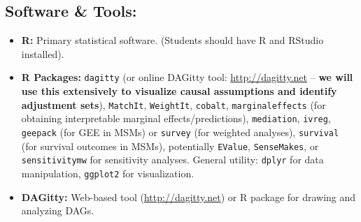 \documentclass[10.5pt]{article}
\begin{document}
\subsection{Software \& Tools:}
\begin{itemize}
    \item \textbf{R:} Primary statistical software. (Students should have R and RStudio installed).
    \item \textbf{R Packages:} \texttt{dagitty} (or online DAGitty tool: \url{http://dagitty.net} – \textbf{we will use this extensively to visualize causal assumptions and identify adjustment sets}), \texttt{MatchIt}, \texttt{WeightIt}, \texttt{cobalt}, \texttt{marginaleffects} (for obtaining interpretable marginal effects/predictions), \texttt{mediation}, \texttt{ivreg}, \texttt{geepack} (for GEE in MSMs) or \texttt{survey} (for weighted analyses), \texttt{survival} (for survival outcomes in MSMs), potentially \texttt{EValue}, \texttt{SenseMakes}, or \texttt{sensitivitymw} for sensitivity analyses. General utility: \texttt{dplyr} for data manipulation, \texttt{ggplot2} for visualization.
    \item \textbf{DAGitty:} Web-based tool (\url{http://dagitty.net}) or R package for drawing and analyzing DAGs.
\end{itemize}
\end{document}
